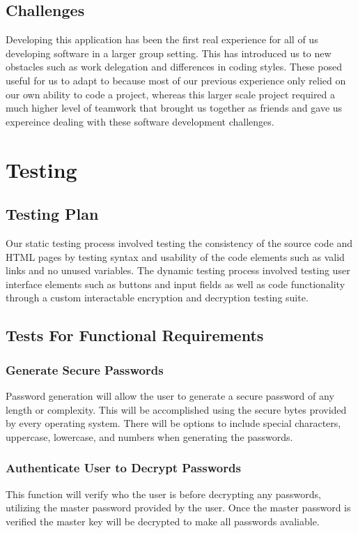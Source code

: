 \documentclass[11pt]{report}
\begin{document}
\section{Challenges}
Developing this application has been the first real experience for all of us
developing software in a larger group setting. This has introduced us to new
obstacles such as work delegation and differences in coding styles. These posed
useful for us to adapt to because most of our previous experience only relied
on our own ability to code a project, whereas this larger scale project 
required a much higher level of teamwork that brought us together as friends
and gave us expereince dealing with these software development challenges.




\chapter{Testing}

\section{Testing Plan}
Our static testing process involved testing the consistency of the source code 
and HTML pages by testing syntax and usability of the code elements such as 
valid links and no unused variables. The dynamic testing process involved
testing user interface elements such as buttons and input fields as well as 
code functionality through a custom interactable encryption and decryption
testing suite.


\section{Tests For Functional Requirements}

\subsection{Generate Secure Passwords}
Password generation will allow the user to generate a secure password of any length or 
complexity. This will be accomplished using the secure bytes provided by every
operating system. There will be options to include special characters, uppercase,
lowercase, and numbers when generating the passwords.

\subsection{Authenticate User to Decrypt Passwords}
This function will verify who the user is before decrypting any passwords, utilizing 
the master password provided by the user. Once the master password is verified
the master key will be decrypted to make all passwords avaliable.
\end{document}
